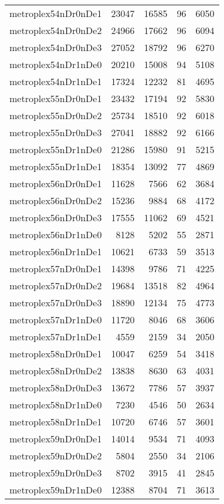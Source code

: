\begin{tabular}{lrrrr}
metroplex54nDr0nDe1 & 23047 & 16585 & 96 & 6050 \\
metroplex54nDr0nDe2 & 24966 & 17662 & 96 & 6094 \\
metroplex54nDr0nDe3 & 27052 & 18792 & 96 & 6270 \\
metroplex54nDr1nDe0 & 20210 & 15008 & 94 & 5108 \\
metroplex54nDr1nDe1 & 17324 & 12232 & 81 & 4695 \\
metroplex55nDr0nDe1 & 23432 & 17194 & 92 & 5830 \\
metroplex55nDr0nDe2 & 25734 & 18510 & 92 & 6018 \\
metroplex55nDr0nDe3 & 27041 & 18882 & 92 & 6166 \\
metroplex55nDr1nDe0 & 21286 & 15980 & 91 & 5215 \\
metroplex55nDr1nDe1 & 18354 & 13092 & 77 & 4869 \\
metroplex56nDr0nDe1 & 11628 & 7566 & 62 & 3684 \\
metroplex56nDr0nDe2 & 15236 & 9884 & 68 & 4172 \\
metroplex56nDr0nDe3 & 17555 & 11062 & 69 & 4521 \\
metroplex56nDr1nDe0 & 8128 & 5202 & 55 & 2871 \\
metroplex56nDr1nDe1 & 10621 & 6733 & 59 & 3513 \\
metroplex57nDr0nDe1 & 14398 & 9786 & 71 & 4225 \\
metroplex57nDr0nDe2 & 19684 & 13518 & 82 & 4964 \\
metroplex57nDr0nDe3 & 18890 & 12134 & 75 & 4773 \\
metroplex57nDr1nDe0 & 11720 & 8046 & 68 & 3606 \\
metroplex57nDr1nDe1 & 4559 & 2159 & 34 & 2050 \\
metroplex58nDr0nDe1 & 10047 & 6259 & 54 & 3418 \\
metroplex58nDr0nDe2 & 13838 & 8630 & 63 & 4031 \\
metroplex58nDr0nDe3 & 13672 & 7786 & 57 & 3937 \\
metroplex58nDr1nDe0 & 7230 & 4546 & 50 & 2634 \\
metroplex58nDr1nDe1 & 10720 & 6746 & 57 & 3601 \\
metroplex59nDr0nDe1 & 14014 & 9534 & 71 & 4093 \\
metroplex59nDr0nDe2 & 5804 & 2550 & 34 & 2106 \\
metroplex59nDr0nDe3 & 8702 & 3915 & 41 & 2845 \\
metroplex59nDr1nDe0 & 12388 & 8704 & 71 & 3613 \\

\end{tabular}
